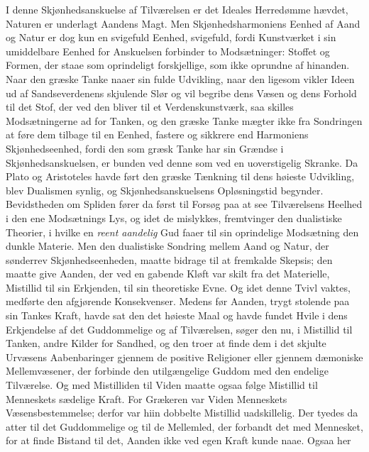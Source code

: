 \documentclass[12pt,a4paper,openany]{book}
\newcommand{\opage}[1]{\marginnote{\footnotesize\textit{[#1]}}}
\begin{document}
I denne Skjønhedsanskuelse af Tilværelsen er det Ideales
Herredømme hævdet, Naturen er underlagt Aandens Magt.
Men Skjønhedsharmoniens Eenhed af Aand og Natur er dog
kun en svigefuld Eenhed, svigefuld, fordi Kunstværket i sin
umiddelbare Eenhed for Anskuelsen forbinder to Modsætninger:
Stoffet og Formen, der staae som oprindeligt forskjellige,
som ikke oprundne af hinanden. Naar den græske Tanke
naaer sin fulde Udvikling, naar den ligesom vikler Ideen ud
af Sandseverdenens skjulende Slør og vil begribe dens Væsen
og dens Forhold til det Stof, der ved den bliver til et
\opage{444}Verdenskunstværk, saa skilles Modsætningerne ad for Tanken,
og den græske Tanke mægter ikke fra Sondringen at føre
dem tilbage til en Eenhed, fastere og sikkrere end Harmoniens
Skjønhedseenhed, fordi den som græsk Tanke har sin Grændse
i Skjønhedsanskuelsen, er bunden ved denne som ved en
uoverstigelig Skranke. Da Plato og Aristoteles havde ført
den græske Tænkning til dens høieste Udvikling, blev Dualismen
synlig, og Skjønhedsanskuelsens Opløsningstid begynder.
Bevidstheden om Spliden fører da først til Forsøg
paa at see Tilværelsens Heelhed i den ene Modsætnings Lys,
og idet de mislykkes, fremtvinger den dualistiske Theorier, i
hvilke en \emph{reent aandelig} Gud faaer til sin oprindelige
Modsætning den dunkle Materie. Men den dualistiske Sondring
mellem Aand og Natur, der sønderrev Skjønhedseenheden,
maatte bidrage til at fremkalde Skepsis; den maatte
give Aanden, der ved en gabende Kløft var skilt fra det
Materielle, Mistillid til sin Erkjenden, til sin theoretiske Evne.
Og idet denne Tvivl vaktes, medførte den afgjørende Konsekvenser.
Medens før Aanden, trygt stolende paa sin Tankes
Kraft, havde sat den det høieste Maal og havde fundet Hvile
i dens Erkjendelse af det Guddommelige og af Tilværelsen,
søger den nu, i Mistillid til Tanken, andre Kilder for
Sandhed, og den troer at finde dem i det skjulte Urvæsens
Aabenbaringer gjennem de positive Religioner eller gjennem
dæmoniske Mellemvæsener, der forbinde den utilgængelige
Guddom med den endelige Tilværelse. Og med Mistilliden
til Viden maatte ogsaa følge Mistillid til Menneskets sædelige
Kraft. For Grækeren var Viden Menneskets Væsensbestemmelse;
derfor var hiin dobbelte Mistillid uadskillelig.
Der tyedes da atter til det Guddommelige og til de Mellemled,
der forbandt det med Mennesket, for at finde Bistand til
det, Aanden ikke ved egen Kraft kunde naae. Ogsaa her
\end{document}
